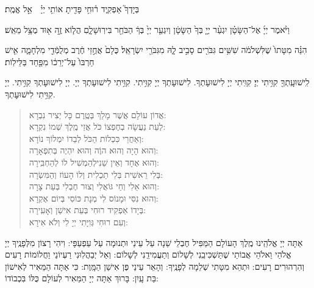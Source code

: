 \documentclass[twoside, openany, parskip=half, 11pt]{book}
\begin{document}
בְּיָדְךָ֮ אַפְקִ֢יד ר֫וּחִ֥י פָּדִ֖יתָ אוֹתִ֥י יְיָ֗ אֵ֣ל אֱמֶֽת׃

וַיֹּ֨אמֶר יְיָ֜ אֶל־הַשָּׂטָ֗ן יִגְעַ֨ר יְיָ֤ בְּךָ֙ הַשָּׂטָ֔ן וְיִגְעַ֤ר יְיָ֙ בְּךָ֔ הַבֹּחֵ֖ר בִּירֽוּשָׁלָ֑םִ הֲל֧וֹא זֶ֦ה א֖וּד מֻצָּ֥ל מֵאֵֽשׁ׃
  
הִנֵּ֗ה מִטָּתוֹ֙ שֶׁלִּשְׁלֹמֹ֔ה שִׁשִּׁ֥ים גִּבֹּרִ֖ים סָבִ֣יב לָ֑הּ מִגִּבֹּרֵ֖י יִשְׂרָאֵֽל׃ כֻּלָם֙ אֲחֻ֣זֵי חֶ֔רֶב מְלֻמְּֿדֵ֖י מִלְחָמָ֑ה אִ֤ישׁ חַרְבּוֹ֙ עַל־יְרֵכ֔וֹ מִפַּ֖חַד בַּלֵּילֽוֹת׃


לִֽישׁוּעָֽתְךָ֖ קִוִּ֥יתִי יְיָ׃ קִוִּֽיתִי יְיָ לִישׁוּעָתְךָ. לִישׁוּעָתְךָ יְיָ קִוִּ֥יתִי. קִוִּ֥יתִי לִישׁוּעָתְךָ יְיָ. יְיָ לִישׁוּעָתְךָ קִוִּ֥יתִי. יְיָ  קִוִּ֥יתִי לִישׁוּעָתְךָ.

\vspace{-\baselineskip}
\begin{quote}

אֲדוֹן עוֹלָם אֲשֶׁר מָלַךְ \hfill  בְּטֶֽרֶם כָּל יְצִיר נִבְרָא:\\
 לְעֵת נַעֲשָׂה בְחֶפְצוֹ כֹּל \hfill אֲזַי מֶֽלֶךְ שְׁמוֹ נִקְרָא:\\
וְאַחֲרֵי כִּכְלוֹת הַכֹּל \hfill לְבַדוֹ יִמְלוֹךְ נוֹרָא:\\
וְהוּא הָיָה וְהוּא הוֶֹה \hfill וְהוּא יִהְיֶה בְּתִפְאָרָה:\\
וְהוּא אֶחָד וְאֵין שֵׁנִי\hfill לְהַמְשִׁיל לוֹ לְהַחְבִּֽירָה:\\
בְּלִי רֵאשִׁית בְּלִי תַכְלִית \hfill וְלוֹ הָעוֹז וְהַמִּשְׂרָה:\\
וְהוּא אֵלִי וְחַי גּוֹאֲלִי \hfill וְצוּר חֶבְלִי בְּעֵת צָרָה:\\
וְהוּא נִסִּי וּמָנוֹס לִי \hfill מְנָת כּוֹסִי בְּיוֹם אֶקְרָא:\\
בְּיָדוֹ אַפְקִיד רוּחִי \hfill בְּעֵת אִישַׁן וְאָעִֽירָה:\\
וְעִם רוּחִי גְּוִיָּתִי \hfill יְיָ לִי וְלֹא אִירָא:

\end{quote}


 אַתָּה יְיָ אֱלֹהֵֽינוּ מֶֽלֶךְ הָעוֹלָם הַמַּפִּיל חֶבְלֵי שֵׁנָה עַל עֵינַי וּתְנוּמָה עַל עַפְעַפָּי: וִיהִי רָצוֹן מִלְּפָנֶֽיךָ יְיָ אֱלֹהַי וֵאלֹהֵי אֲבוֹתַי שֶׁתַּשְׁכִּיבֵֽנִי לְשָׁלוֹם וְתַעֲמִידֵֽנִי לְשָׁלוֹם: וְאַל יְבַהֲלֽוּנִי רַעְיוֹנַי וַחֲלוֹמוֹת רָעִים וְהִרְהוּרִים רָעִים: וּתְהֵא מִטָּתִי שְׁלֵמָה לְפָנֶֽיךָ: וְהָאֵר עֵינַי פֶּן אִישַׁן הַמָּֽוֶת: כִּי אַתָּה הַמֵּאִיר לְאִישׁוֹן בַּת עָֽיִן: בָּרוּךְ אַתָּה יְיָ הַמֵּאִיר לְעוֹלָם כֻּלּוֹ בִּכְבוֹדוֹ:

\vfill

\sepline
\end{document}
